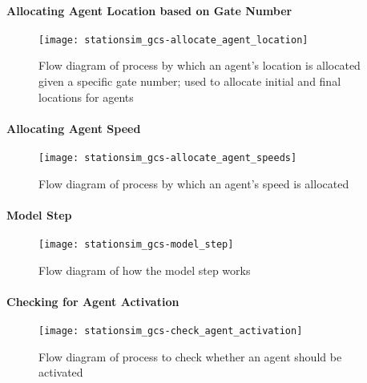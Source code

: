 \paragraph{Allocating Agent Location based on Gate
Number}\label{para:submodels:location_allocation}

\begin{figure}[h]
    \centering
    \texttt{[image: stationsim\_gcs-allocate\_agent\_location]}
    \caption{Flow diagram of process by which an agent's location is allocated
    given a specific gate number; used to allocate initial and final locations
    for agents}\label{fig:flow:allocate_agent_location}
\end{figure}

\paragraph{Allocating Agent Speed}\label{para:submodels:agent_speed}

\begin{figure}[h]
    \centering
    \texttt{[image: stationsim\_gcs-allocate\_agent\_speeds]}
    \caption{Flow diagram of process by which an agent's speed is
    allocated}\label{fig:flow:allocate_agent_speed}
\end{figure}

\paragraph{Model Step}\label{para:submodels:model_step}

\begin{figure}[h]
    \centering
    \texttt{[image: stationsim\_gcs-model\_step]}
    \caption{Flow diagram of how the model step
    works}\label{fig:flow:model_step}
\end{figure}

\paragraph{Checking for Agent Activation}\label{para:submodels:agent_activation}

\begin{figure}[h]
    \centering
    \texttt{[image: stationsim\_gcs-check\_agent\_activation]}
    \caption{Flow diagram of process to check whether an agent should be
    activated}\label{fig:flow:check_agent_activation}
\end{figure}

